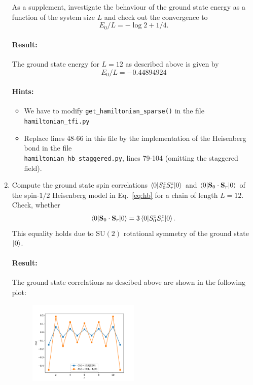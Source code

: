 \documentclass[]{article}
\theoremstyle{definition}
\begin{document}
\begin{enumerate}[label=(\alph*)]
  As a supplement, investigate the behaviour of the ground state
  energy as a function of the system size $L$ and check out the
  convergence to
  \begin{equation*}
    E_0/L = -\log{2} + 1/4. 
  \end{equation*}
  \paragraph{Result:}
  The ground state energy for $L=12$ as described above is given by
  $$E_0/L = -0.44894924 $$
  \paragraph{Hints:}
  \begin{itemize}
  \item We have to modify \texttt{get\_hamiltonian\_sparse()} in the
    file \texttt{hamiltonian\_tfi.py}
  \item Replace lines 48-66 in this file by the implementation of the
    Heisenberg bond in the file\\
    \texttt{hamiltonian\_hb\_staggered.py}, lines 79-104 (omitting the
    staggered field).
  \end{itemize}

\item Compute the ground state spin correlations
  $\braket{0|S^z_0S^z_r|0}$ and
  $\braket{0|\mathbf{S}_0\cdot\mathbf{S}_r|0}$ of the spin-$1/2$
  Heisenberg model in Eq.~\ref{eq:hb} for a chain of length
  $L=12$. Check, whether
  $$\braket{0|\mathbf{S}_0\cdot\mathbf{S}_r|0} = 3\braket{0|S^z_0S^z_r|0}.$$
  This equality holds due to $\mathrm{SU}(2)$ rotational symmetry of
  the ground state $\ket{0}$.
  \paragraph{Result:}
  The ground state correlations as descibed above are shown in the
  following plot:
  \begin{figure}[H]
    \centering
    \includegraphics[width=0.5\textwidth]{correlations_hbchain_12.pdf}
  \end{figure}

\end{enumerate}
\end{document}
